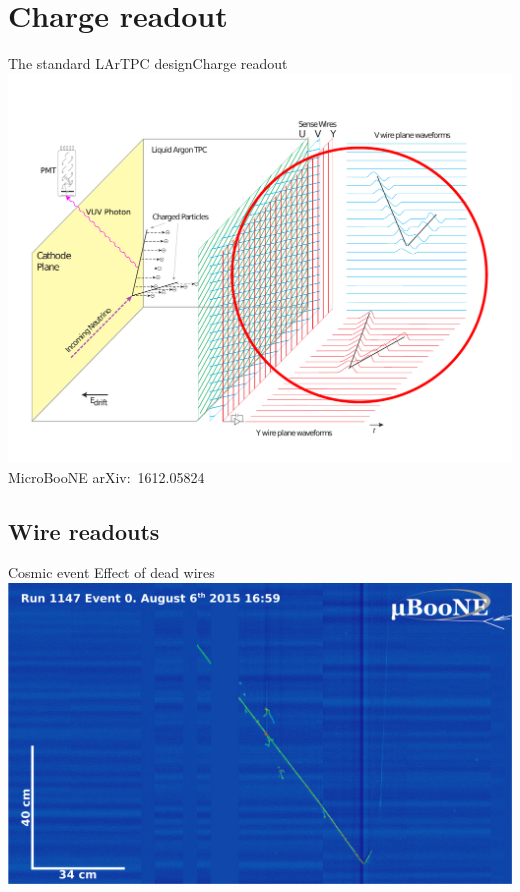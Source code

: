 \documentclass[]{beamer}
\newcommand*{\emphcol}{blue}
\newcommand*{\uboone}{{MicroBooNE}}
\newcommand*{\lartpc}{{LArTPC}}
\begin{document}
\section{Charge readout}

\begin{frame}{The standard \lartpc{} design}{Charge readout}
	\centering
	\includegraphics[viewport=35 40 755 540, clip, height=.66\textheight]{defence/TPCprinciple_charge-ro}\\
	{\tiny \uboone{} arXiv:~1612.05824~\cite{uboone}}\\
\end{frame}

\subsection{Wire readouts}

\begin{frame}{Cosmic event}{\color{\emphcol} Effect of dead wires}
	\centering
	\includegraphics[width=\textwidth]{defence/uboone_event}
\end{frame}
\end{document}
